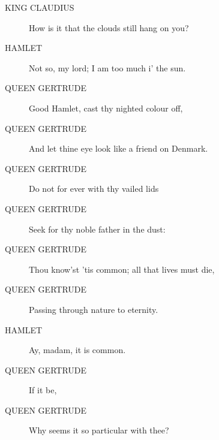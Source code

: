 \documentclass{article}
\begin{document}
\begin{description}
            
\item[KING CLAUDIUS] How is it that the clouds still hang on you?
\end{description}
          
\begin{description}
            
\item[HAMLET] Not so, my lord; I am too much i' the sun.
\end{description}
          
\begin{description}
            
\item[QUEEN GERTRUDE] Good Hamlet, cast thy nighted colour off,
\item[QUEEN GERTRUDE] And let thine eye look like a friend on Denmark.
\item[QUEEN GERTRUDE] Do not for ever with thy vailed lids
\item[QUEEN GERTRUDE] Seek for thy noble father in the dust:
\item[QUEEN GERTRUDE] Thou know'st 'tis common; all that lives must die,
\item[QUEEN GERTRUDE] Passing through nature to eternity.
\end{description}
          
\begin{description}
            
\item[HAMLET] Ay, madam, it is common.
\end{description}
          
\begin{description}
            
\item[QUEEN GERTRUDE] If it be,
\item[QUEEN GERTRUDE] Why seems it so particular with thee?
\end{description}
          
\end{document}
